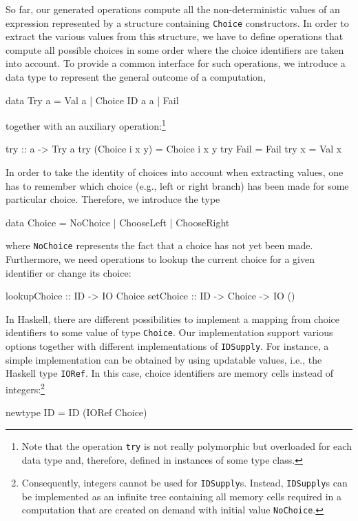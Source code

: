 \documentclass{llncs}
\newcommand{\code}[1]{\mbox{\small\texttt{#1}}}
\begin{document}
So far, our generated operations compute all the non-deterministic
values of an expression represented by a structure containing
\code{Choice} constructors. In order to extract the various
values from this structure, we have to define operations
that compute all possible choices in some order where the choice identifiers
are taken into account.
To provide a common interface for such operations, we introduce
a data type to represent the general outcome of a computation,
\begin{haskell}
  data Try a = Val a | Choice ID a a | Fail
\end{haskell}
together with an auxiliary operation:\footnote{Note that the
operation \code{try} is not really polymorphic but overloaded
for each data type and, therefore, defined in instances of some type class.}
\begin{haskell}
  try :: a -> Try a
  try (Choice i x y) = Choice i x y
  try Fail           = Fail
  try x              = Val x
\end{haskell}
In order to take the identity of choices into account when extracting values,
one has to remember which choice (e.g., left or right branch)
has been made for some particular choice.
Therefore, we introduce the type
\begin{haskell}
  data Choice = NoChoice | ChooseLeft | ChooseRight
\end{haskell}
where \code{NoChoice} represents the fact that a choice has not yet been made.
Furthermore, we need operations to lookup the current choice
for a given identifier or change its choice:
\begin{haskell}
  lookupChoice :: ID -> IO Choice
  setChoice    :: ID -> Choice -> IO ()
\end{haskell}
In Haskell, there are different possibilities to implement a mapping
from choice identifiers to some value of type \code{Choice}.
Our implementation support various options together with different
implementations of \code{IDSupply}.
For instance, a simple implementation can be obtained by
using updatable values, i.e., the Haskell type \code{IORef}.
In this case, choice identifiers are memory cells instead of integers:\footnote{%
Consequently, integers cannot be used for \code{IDSupply}s. Instead,
\code{IDSupply}s can be implemented as an infinite tree containing
all memory cells required in a computation that are created
on demand with initial value \code{NoChoice}.}
\begin{haskell}
  newtype ID = ID (IORef Choice)
\end{haskell}
\end{document}
